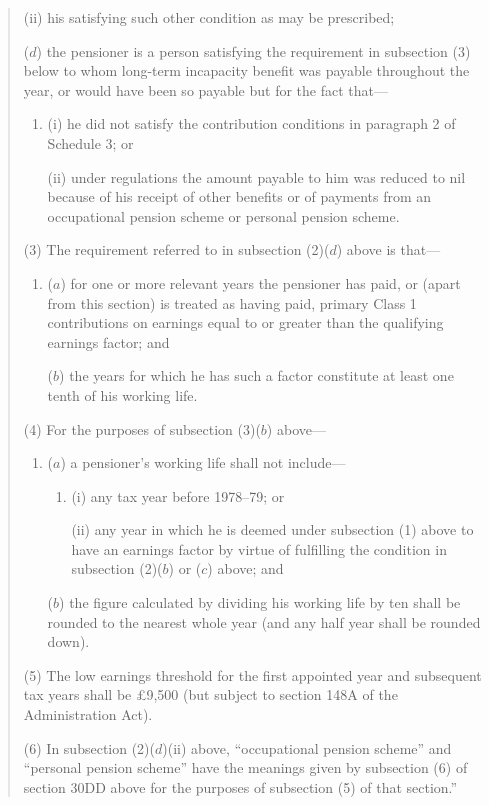 \documentclass[12pt,a4paper]{article}
\begin{document}
\begin{quotation}
\begin{enumerate}
\begin{enumerate}
(ii) his satisfying such other condition as may be prescribed;
\end{enumerate}

($d$) the pensioner is a person satisfying the requirement in subsection (3)  below to whom long-term incapacity benefit was payable throughout the year, or would have been so payable but for the fact that—
\begin{enumerate}\item[]
(i) he did not satisfy the contribution conditions in paragraph 2 of Schedule 3; or

(ii) under regulations the amount payable to him was reduced to nil because of his receipt of other benefits or of payments from an occupational pension scheme or personal pension scheme.
\end{enumerate}
\end{enumerate}

(3) The requirement referred to in subsection (2)($d$)  above is that—
\begin{enumerate}\item[]
($a$) for one or more relevant years the pensioner has paid, or (apart from this section) is treated as having paid, primary Class 1 contributions on earnings equal to or greater than the qualifying earnings factor; and

($b$) the years for which he has such a factor constitute at least one tenth of his working life.
\end{enumerate}

(4) For the purposes of subsection (3)($b$)  above—
\begin{enumerate}\item[]
($a$) a pensioner’s working life shall not include—
\begin{enumerate}\item[]
(i) any tax year before 1978--79; or

(ii) any year in which he is deemed under subsection (1)  above to have an earnings factor by virtue of fulfilling the condition in subsection (2)($b$)  or ($c$)  above; and
\end{enumerate}

($b$) the figure calculated by dividing his working life by ten shall be rounded to the nearest whole year (and any half year shall be rounded down).
\end{enumerate}

(5) The low earnings threshold for the first appointed year and subsequent tax years shall be £9,500 (but subject to section 148A of the Administration Act).

(6) In subsection (2)($d$)(ii)  above, “occupational pension scheme” and “personal pension scheme” have the meanings given by subsection (6)  of section 30DD above for the purposes of subsection (5)  of that section.”
\end{quotation}
\end{document}
